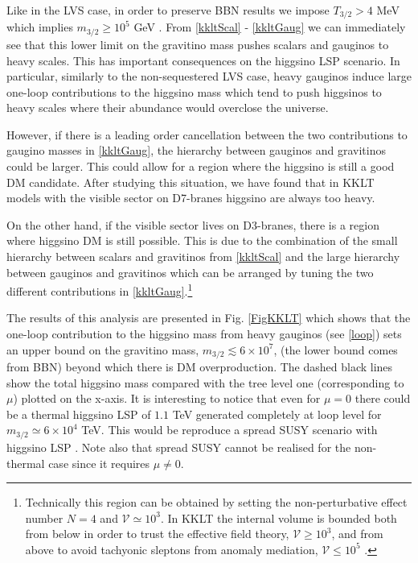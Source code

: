 \documentclass[11pt,a4paper]{article}
\newcommand{\mc}{\mathcal}
\begin{document}
Like in the LVS case, in order to preserve BBN results we impose $T_{3/2} > 4$ MeV which implies $m_{3/2} \geq 10^5$ GeV \cite{Nakamura:2006uc}. From \eqref{kkltScal} - \eqref{kkltGaug} we can immediately see that this lower limit on the gravitino mass pushes scalars and gauginos to heavy scales. This has important consequences on the higgsino LSP scenario. In particular, similarly to the non-sequestered LVS case, heavy gauginos induce large one-loop contributions to the higgsino mass which tend to push higgsinos to heavy scales where their abundance would overclose the universe. 

However, if there is a leading order cancellation between the two contributions to gaugino masses in \eqref{kkltGaug}, the hierarchy between gauginos and gravitinos could be larger. This could allow for a region where the higgsino is still a good DM candidate. After studying this situation, we have found that in KKLT models with the visible sector on D7-branes higgsino are always too heavy. 

On the other hand, if the visible sector lives on D3-branes, there is a region where higgsino DM is still possible. This is due to the combination of the small hierarchy between scalars and gravitinos from \eqref{kkltScal} and the large hierarchy between gauginos and gravitinos which can be arranged by tuning  the two different contributions in \eqref{kkltGaug}.\footnote{Technically this region can be obtained by setting the non-perturbative effect number $N=4$ and $\mc{V}\simeq 10^3$. In KKLT the internal volume is bounded both from below in order to trust the effective field theory, $\mc{V}\geq 10^3$, and from above  to avoid tachyonic sleptons from anomaly mediation, $\mc{V}\leq 10^5$ \cite{Aparicio:2015psl}.}

The results of this analysis are presented in Fig. \ref{FigKKLT} which shows that the one-loop contribution to the higgsino mass from heavy gauginos (see \eqref{loop}) sets an upper bound on the gravitino mass, $m_{3/2}\lesssim 6\times 10^7$, (the lower bound comes from BBN) beyond which there is DM overproduction. The dashed black lines show the total higgsino mass compared with the tree level one (corresponding to $\mu$) plotted on the x-axis. It is interesting to notice that even for $\mu = 0$ there could be a thermal higgsino LSP of $1.1$ TeV generated completely at loop level for $m_{3/2} \simeq 6\times 10^4$ TeV. This would be reproduce a spread SUSY scenario with higgsino LSP \cite{Hall:2011jd}. Note also that spread SUSY cannot be realised for the non-thermal case since it requires $\mu \neq 0$.
\end{document}
